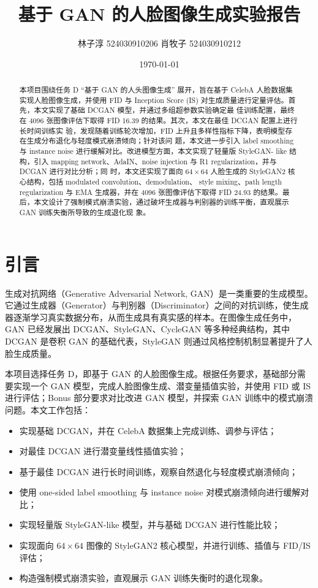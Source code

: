 \documentclass[UTF8,a4paper,12pt]{ctexart}
\title{基于 GAN 的人脸图像生成实验报告}
\author{林子淳 524030910206 肖牧子 524030910212}
\date{\today}
\begin{document}
\maketitle

\begin{abstract}
  本项目围绕任务 D ``基于 GAN 的人头图像生成'' 展开，旨在基于 CelebA 人脸数据集实现人脸图像生成，并使用 FID
  与 Inception Score (IS) 对生成质量进行定量评估。首先，本文实现了基础 DCGAN 模型，并通过多组超参数实验确定最
  佳训练配置，最终在 4096 张图像评估下取得 FID 16.39 的结果。其次，本文在最佳 DCGAN 配置上进行长时间训练实
  验，发现随着训练轮次增加，FID 上升且多样性指标下降，表明模型存在生成分布退化与轻度模式崩溃倾向；针对该问
  题，本文进一步引入 label smoothing 与 instance noise 进行缓解对比。改进模型方面，本文实现了轻量版 StyleGAN-
  like 结构，引入 mapping network、AdaIN、noise injection 与 R1 regularization，并与 DCGAN 进行对比分析；同
  时，本文还实现了面向 $64\times64$ 人脸生成的 StyleGAN2 核心结构，包括 modulated convolution、demodulation、
  style mixing、path length regularization 与 EMA 生成器，并在 4096 张图像评估下取得 FID 24.93 的结果。最
  后，本文设计了强制模式崩溃实验，通过破坏生成器与判别器的训练平衡，直观展示 GAN 训练失衡所导致的生成退化现
  象。
\end{abstract}

\section{引言}

生成对抗网络（Generative Adversarial Network, GAN）是一类重要的生成模型。它通过生成器（Generator）与判别器（Discriminator）之间的对抗训练，使生成器逐渐学习真实数据分布，从而生成具有真实感的样本。在图像生成任务中，GAN 已经发展出 DCGAN、StyleGAN、CycleGAN 等多种经典结构，其中 DCGAN 是卷积 GAN 的基础代表，StyleGAN 则通过风格控制机制显著提升了人脸生成质量。

本项目选择任务 D，即基于 GAN 的人脸图像生成。根据任务要求，基础部分需要实现一个 GAN 模型，完成人脸图像生成、潜变量插值实验，并使用 FID 或 IS 进行评估；Bonus 部分要求对比改进 GAN 模型，并探索 GAN 训练中的模式崩溃问题。本文工作包括：

\begin{itemize}
    \item 实现基础 DCGAN，并在 CelebA 数据集上完成训练、调参与评估；
    \item 对最佳 DCGAN 进行潜变量线性插值实验；
    \item 基于最佳 DCGAN 进行长时间训练，观察自然退化与轻度模式崩溃倾向；
    \item 使用 one-sided label smoothing 与 instance noise 对模式崩溃倾向进行缓解对比；
    \item 实现轻量版 StyleGAN-like 模型，并与基础 DCGAN 进行性能比较；
    \item 实现面向 $64\times64$ 图像的 StyleGAN2 核心模型，并进行训练、插值与 FID/IS 评估；
    \item 构造强制模式崩溃实验，直观展示 GAN 训练失衡时的退化现象。
\end{itemize}
\end{document}
